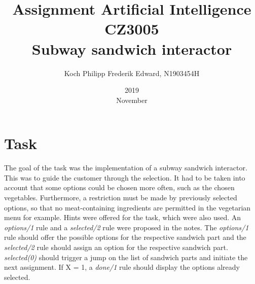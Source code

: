 \documentclass{article}
\title{Assignment Artificial Intelligence CZ3005 \\ Subway sandwich interactor}
\date{2019 \\ November}
\author{Koch Philipp Frederik Edward, N1903454H}
\begin{document}
	\maketitle
	\section{Task}
	The goal of the task was the implementation of a subway sandwich interactor. This was to guide the customer through the selection. It had to be taken into account that some options could be chosen more often, such as the chosen vegetables. Furthermore, a restriction must be made by previously selected options, so that no meat-containing ingredients are permitted in the vegetarian menu for example. Hints were offered for the task, which were also used. An \textit{options/1} rule and a \textit{selected/2} rule were proposed in the notes. The \textit{options/1} rule should offer the possible options for the respective sandwich part and the \textit{selected/2} rule should assign an option for the respective sandwich part. \textit{selected(0)} should trigger a jump on the list of sandwich parts and initiate the next assignment. If X = 1, a \textit{done/1} rule should display the options already selected. 
\end{document}
